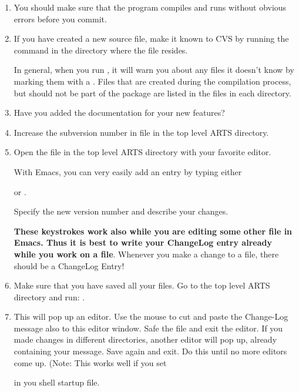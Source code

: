\begin{enumerate}
\item You should make sure that the program compiles and runs without
  obvious errors before you commit.
\item If you have created a new source file, make it known to CVS by
  running the command  in the directory where
  the file resides.
  
  In general, when you run , it will warn you about
  any files it doesn't know by marking them with a . Files
  that are created during the compilation process, but should not be
  part of the package are listed in the  files in
  each directory.
\item Have you added the documentation for your new features?
\item Increase the subversion number in file  in
  the top level ARTS directory.
\item Open the file  in the top level ARTS directory
  with your favorite editor.
  
  With Emacs, you can very easily add an entry by typing either
  \begin{quote}
  \end{quote}
  or .
  
  Specify the new version number and describe your changes.

  \textbf{These keystrokes work also while you are editing some other
    file in Emacs. Thus it is best to write your ChangeLog entry
    already while you work on a file}. Whenever you make a change to a
  file, there should be a ChangeLog Entry!
\item Make sure that you have saved all your files. Go to the top
  level ARTS directory and run: .
\item This will pop up an editor. Use the mouse to cut and paste the
  Change-Log message also to this editor window. Safe the file and exit
  the editor. If you made changes in different directories, another
  editor will pop up, already containing your message. Save again and
  exit. Do this until no more editors come up. (Note: This works well
  if you set
  \begin{quote}
  \end{quote}
  in you shell startup file.
 

\end{enumerate}
